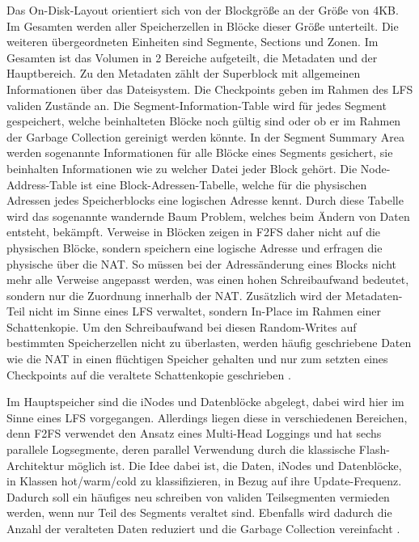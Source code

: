\documentclass[11pt]{article}
\begin{document}
Das On-Disk-Layout orientiert sich von der Blockgröße an der Größe von 4KB. Im Gesamten werden aller Speicherzellen in Blöcke dieser Größe unterteilt. Die weiteren übergeordneten Einheiten sind Segmente, Sections und Zonen. Im Gesamten ist das Volumen in 2 Bereiche aufgeteilt, die Metadaten und der Hauptbereich. Zu den Metadaten zählt der Superblock mit allgemeinen Informationen über das Dateisystem.
Die Checkpoints geben im Rahmen des LFS validen Zustände an.
Die Segment-Information-Table wird für jedes Segment gespeichert, welche beinhalteten Blöcke noch gültig sind oder ob er im Rahmen der Garbage Collection gereinigt werden könnte.
In der Segment Summary Area werden sogenannte Informationen für alle Blöcke eines Segments gesichert, sie beinhalten Informationen wie zu welcher Datei jeder Block gehört.
Die Node-Address-Table ist eine Block-Adressen-Tabelle, welche für die physischen Adressen jedes Speicherblocks eine logischen Adresse kennt. Durch diese Tabelle wird das sogenannte wandernde Baum Problem, welches beim Ändern von Daten entsteht, bekämpft. Verweise in Blöcken zeigen in F2FS daher nicht auf die physischen Blöcke, sondern speichern eine logische Adresse und erfragen die physische über die NAT. So müssen bei der Adressänderung eines Blocks nicht mehr alle Verweise angepasst werden, was einen hohen Schreibaufwand bedeutet, sondern nur die Zuordnung innerhalb der NAT. Zusätzlich wird der Metadaten-Teil nicht im Sinne eines LFS verwaltet, sondern In-Place im Rahmen einer Schattenkopie. Um den Schreibaufwand bei diesen Random-Writes auf bestimmten Speicherzellen nicht zu überlasten, werden häufig geschriebene Daten wie die NAT in einen flüchtigen Speicher gehalten und nur zum setzten eines Checkpoints auf die veraltete Schattenkopie geschrieben \cite{lee2015f2fs}.

Im Hauptspeicher sind die iNodes und Datenblöcke abgelegt, dabei wird hier im Sinne eines LFS vorgegangen. Allerdings liegen diese in verschiedenen Bereichen, denn F2FS verwendet den Ansatz eines Multi-Head Loggings und hat sechs parallele Logsegmente, deren parallel Verwendung durch die klassische Flash-Architektur möglich ist. Die Idee dabei ist, die Daten, iNodes und Datenblöcke, in Klassen hot/warm/cold zu klassifizieren, in Bezug auf ihre Update-Frequenz. Dadurch soll ein häufiges neu schreiben von validen Teilsegmenten vermieden werden, wenn nur Teil des Segments veraltet sind. Ebenfalls wird dadurch die Anzahl der veralteten Daten reduziert und die Garbage Collection vereinfacht \cite{lee2015f2fs}.
\end{document}
